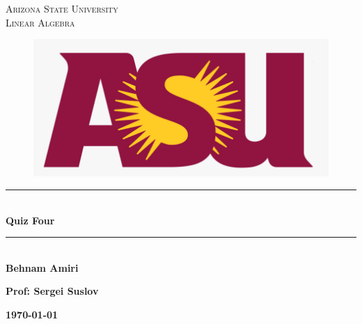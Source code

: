 \documentclass[fleqn]{article}
\begin{document}
  \begin{titlepage}

    \newcommand{\HRule}{\rule{\linewidth}{0.5mm}}

    \center


    \textsc{\LARGE Arizona State University}\\[1.5cm]

    \textsc{\LARGE Linear Algebra }\\[1.5cm]


    \begin{figure}
      \includegraphics[width=\linewidth]{asu.png}
    \end{figure}


    \HRule \\[0.4cm]
    { \huge \bfseries Quiz Four}\\[0.4cm] 
    \HRule \\[1.5cm]

    \textbf{Behnam Amiri}

    \bigbreak

    \textbf{Prof: Sergei Suslov}

    \bigbreak


    \textbf{{\large \today}\\[2cm]}

    \vfill

  \end{titlepage}
\end{document}
